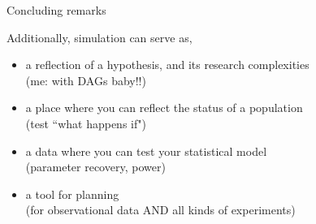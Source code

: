 %
%
\begin{lhframe}[rhgraphic={\texttt{[image: think2.jpg]}}]
	{Concluding remarks}
	
	Additionally, simulation can serve as,
	\begin{itemize}
		\item a reflection of a hypothesis, and its research complexities\\
		{\small (me: with DAGs baby!!)}
		\item a place where you can reflect the status of a population \\
		{\small (test ``what happens if") }
		\item a data where you can test your statistical model \\
		{\small (parameter recovery, power) }
		\item a tool for planning \\
		{\small (for observational data AND \alert{all kinds of} experiments)}
	\end{itemize} 
\end{lhframe}
%
%